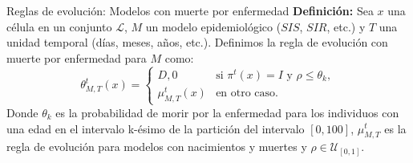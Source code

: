 \documentclass[9pt]{beamer}
\begin{document}
\begin{frame}{Reglas de evolución: Modelos con muerte por enfermedad}
\textbf{Definición:} Sea $x$ una célula en un conjunto $\mathcal{L}$, $M$ un modelo epidemiológico ($SIS$, $SIR$, etc.) y $T$ una unidad temporal (días, meses, años, etc.). Definimos la regla de evolución con muerte por enfermedad para $M$ como:
\begin{equation}
    \theta_{M,T}^t(x)=\left\{\begin{array}{ll}
        D,0 & \text{si }\pi^t(x)=I\text{ y }\rho\leq\theta_k, \\
        \mu_{M,T}^t(x) & \text{en otro caso.}
    \end{array}\right.
\end{equation}
Donde $\theta_k$ es la probabilidad de morir por la enfermedad para los individuos con una edad en el intervalo k-ésimo de la partición del intervalo $[0,100]$, $\mu_{M,T}^t$ es la regla de evolución para modelos con nacimientos y muertes y $\rho\in\mathcal{U}_{[0,1]}$.

\end{frame}
\end{document}
